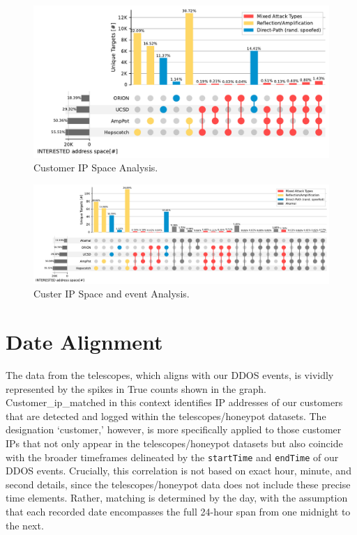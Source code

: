     \begin{figure}[htbp]
        \centering
        \includegraphics[scale=0.4]{graphs/space_no_event.pdf}
        \caption{Customer IP Space Analysis.}
        \label{fig:customeripspace}
        \end{figure}

\begin{figure}[htbp]
    \centering
    \includegraphics[scale=0.48]{graphs/noir3.pdf}
    \caption{Custer IP Space and event Analysis.}
    \label{fig:Mappedaddressanalysis}
    \end{figure}

\section{Date Alignment}\label{sec:date_events_alignment}
The data from the telescopes, which aligns with our DDOS events, is vividly represented by the spikes in True counts shown in the graph. 
Customer\_ip\_matched in this context identifies IP addresses of our customers that are detected and logged within the telescopes/honeypot datasets. The designation `customer,' however, is more specifically applied to those customer IPs that not only appear in the telescopes/honeypot datasets but also coincide with the broader timeframes delineated by the \texttt{startTime} and \texttt{endTime} of our DDOS events. Crucially, this correlation is not based on exact hour, minute, and second details, since the telescopes/honeypot data does not include these precise time elements. Rather, matching is determined by the day, with the assumption that each recorded date encompasses the full 24-hour span from one midnight to the next.
